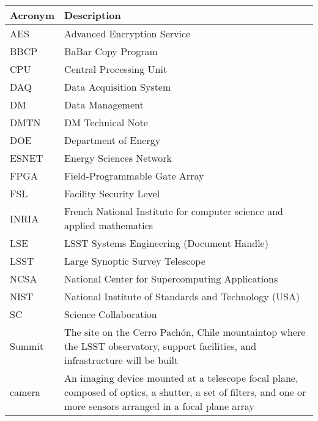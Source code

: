 \addtocounter{table}{-1}
\begin{longtable}{|p{}|p{}|}\hline
\textbf{Acronym} & \textbf{Description}  \\\hline

AES & Advanced Encryption Service \\\hline
BBCP & BaBar Copy Program \\\hline
CPU & Central Processing Unit \\\hline
DAQ & Data Acquisition System \\\hline
DM & Data Management \\\hline
DMTN & DM Technical Note \\\hline
DOE & Department of Energy \\\hline
ESNET & Energy Sciences Network \\\hline
FPGA & Field-Programmable Gate Array \\\hline
FSL & Facility Security Level \\\hline
INRIA & French National Institute for computer science and applied mathematics \\\hline
LSE & LSST Systems Engineering (Document Handle) \\\hline
LSST & Large Synoptic Survey Telescope \\\hline
NCSA & National Center for Supercomputing Applications \\\hline
NIST & National Institute of Standards and Technology (USA) \\\hline
SC & Science Collaboration \\\hline
Summit & The site on the Cerro Pachón, Chile mountaintop where the LSST observatory, support facilities, and infrastructure will be built \\\hline
camera & An imaging device mounted at a telescope focal plane, composed of optics, a shutter, a set of filters, and one or more sensors arranged in a focal plane array \\\hline
\end{longtable}
